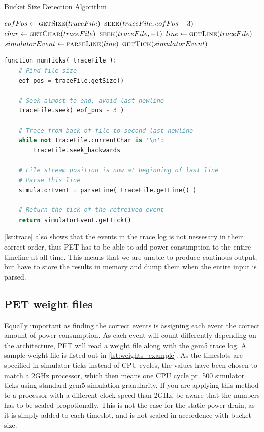 \begin{algorithm}
    \caption{Bucket Size Detection Algorithm}
    \label{alg:bucket_size}
    \begin{algorithmic}

        \State $eofPos \gets \Call{getSize}{traceFile}$
        \State $\Call{seek}{traceFile, eofPos - 3}$
        \State
        \State $char \gets \Call{getChar}{traceFile}$
            \State $\Call{seek}{traceFile, -1}$
        \EndWhile
        \State $line \gets \Call{getLine}{traceFile}$
        \State $simulatorEvent \gets \Call{parseLine}{line}$
        \State \Return $\Call{getTick}{simulatorEvent}$
        \EndFunction
    \end{algorithmic}
    \begin{lstlisting}[language=Python]
function numTicks( traceFile ):
    # Find file size
    eof_pos = traceFile.getSize()

    # Seek almost to end, avoid last newline
    traceFile.seek( eof_pos - 3 )

    # Trace from back of file to second last newline
    while not traceFile.currentChar is '\n':
        traceFile.seek_backwards

    # File stream position is now at beginning of last line
    # Parse this line
    simulatorEvent = parseLine( traceFile.getLine() )

    # Return the tick of the retreived event
    return simulatorEvent.getTick()
    \end{lstlisting}
\end{algorithm}

\autoref{lst:trace} also shows that the events in the trace log is not nessesary in their
correct order, thus PET has to be able to add power consumption to the entire timeline at all
time. This means that we are unable to produce continous output, but have to store the
results in memory and dump them when the entire input is parsed.


\subsection{PET weight files}
Equally important as finding the correct events is assigning each event the
correct amount of power consumption. As each event will count differently
depending on the architecture, PET will read a weight file along with the gem5
trace log. A sample weight file is listed out in \autoref{lst:weights_example}.
As the timeslots are specified in simulator ticks instead of CPU cycles,
the values have been chosen to match a 2GHz processor, which then means
one CPU cycle pr. 500 simulator ticks using standard gem5 simulation granularity.
If you are applying this method to a processor with a different clock speed than
2GHz, be aware that the numbers has to be scaled propotionally. This is not the
case for the static power drain, as it is simply added to each timeslot, and is
not scaled in accordence with bucket size.

